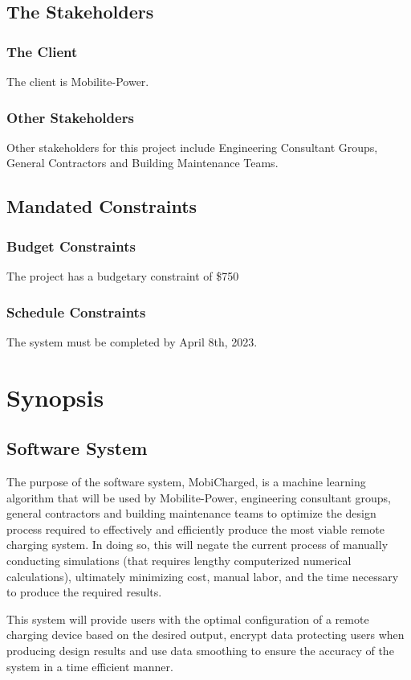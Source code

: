\documentclass[12pt, titlepage]{article}
\begin{document}
\subsection{The Stakeholders}

\subsubsection{The Client}
The client is Mobilite-Power.
\subsubsection{Other Stakeholders}
Other stakeholders for this project include Engineering Consultant Groups, General Contractors and Building Maintenance Teams.
\subsection{Mandated Constraints}

\subsubsection{Budget Constraints}

The project has a budgetary constraint of \$750

\subsubsection{Schedule Constraints}

The system must be completed by April 8th, 2023.

\section{Synopsis}
\subsection{Software System}
The purpose of the software system, MobiCharged, is a machine learning algorithm that will be used by Mobilite-Power, engineering consultant groups, general contractors and building maintenance teams to optimize the design process required to effectively and efficiently produce the most viable remote charging system. In doing so, this will negate the current process of manually conducting simulations (that requires lengthy computerized numerical calculations), ultimately minimizing cost, manual labor, and the time necessary to produce the required results. 
\par
This system will provide users with the optimal configuration of a remote charging device based on the desired output, encrypt data protecting users when producing design results and use data smoothing to ensure the accuracy of the system in a time efficient manner.
\end{document}
